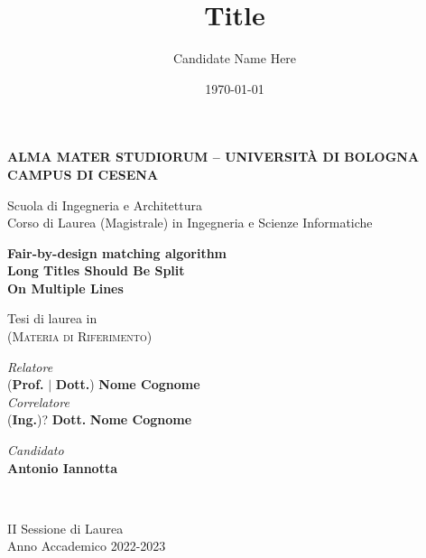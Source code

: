 \title{Title}
\author{Candidate Name Here}
\date{\today}

\begin{titlepage}
	\begin{center}
		
		\large
		\textbf{ALMA MATER STUDIORUM -- UNIVERSITÀ DI BOLOGNA \\ CAMPUS DI CESENA}
		\\
		\noindent\hrulefill
		\vspace{0.4cm}
		
		\Large
		Scuola di Ingegneria e Architettura \\
		Corso di Laurea (Magistrale) in Ingegneria e Scienze Informatiche
		
		\Huge
		\vspace{4cm}
		\textbf{
			Fair-by-design matching algorithm
			\\
			Long Titles Should Be Split
			\\
			On Multiple Lines
		}
		
		\large
		\vspace{1cm}
		Tesi di laurea in 
		\\
		\textsc{(Materia di Riferimento)}
		
		\vspace{5.5cm}
		\begin{minipage}[t]{0.64\textwidth}
			\begin{flushleft}
				\textit{Relatore} 
				\\ 
				(\textbf{Prof.} $\mid$ \textbf{Dott.}) \textbf{Nome Cognome}
				\\
				\vspace{0.4cm}
				\textit{Correlatore} 
				\\
				(\textbf{Ing.})? \textbf{Dott.} \textbf{Nome Cognome}
			\end{flushleft}
		\end{minipage}
		\begin{minipage}[t]{0.34\textwidth}
			\begin{flushright}
				\textit{Candidato} 
				\\ 
				\textbf{Antonio Iannotta}
			\end{flushright}
		\end{minipage}\\
		
		\vfill
		\noindent\hrulefill
		\vspace{0.3cm}
		\Large
		
		II Sessione di Laurea
		\\
		Anno Accademico 2022-2023
	\end{center}
\end{titlepage}
\restoregeometry
